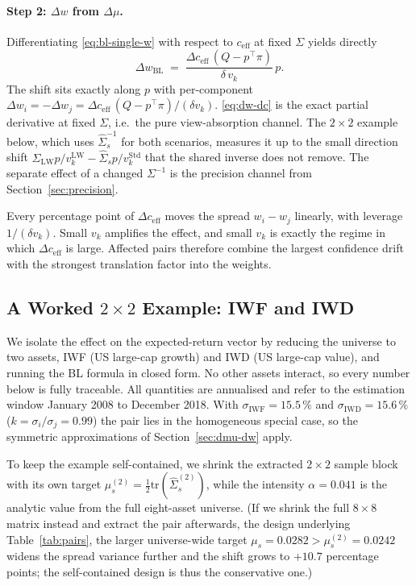 \documentclass[a4paper,11pt]{article}
\theoremstyle{plain}
\theoremstyle{definition}
\newcommand{\Std}{\mathrm{Std}}
\newcommand{\LW}{\mathrm{LW}}
\newcommand{\eff}{\mathrm{eff}}
\begin{document}
\paragraph{Step 2: $\Delta w$ from $\Delta\mu$.}
Differentiating \eqref{eq:bl-single-w} with respect to $c_{\eff}$ at
fixed $\Sigma$ yields directly
\begin{equation}
\label{eq:dw-dc}
  \Delta w_{\mathrm{BL}} \;=\; \frac{\Delta c_{\eff}\,(Q - p^\top\pi)}{\delta\,v_k}\,p.
\end{equation}
The shift sits exactly along $p$ with per-component
$\Delta w_i = -\Delta w_j = \Delta c_{\eff}\,(Q-p^\top\pi)/(\delta v_k)$.
\eqref{eq:dw-dc} is the exact partial derivative at fixed $\Sigma$,
i.e.\ the pure view-absorption channel. The $2\times 2$ example below,
which uses $\hat\Sigma_s^{-1}$ for both scenarios, measures it up to
the small direction shift
$\Sigma_{\LW}p/v_k^{\LW} - \hat\Sigma_s p/v_k^{\Std}$ that the shared
inverse does not remove. The separate effect of a changed $\Sigma^{-1}$
is the precision channel from Section~\ref{sec:precision}.

Every percentage point of $\Delta c_{\eff}$ moves the spread
$w_i - w_j$ linearly, with leverage $1/(\delta v_k)$. Small $v_k$
amplifies the effect, and small $v_k$ is exactly the regime in which
$\Delta c_{\eff}$ is large. Affected pairs therefore combine the largest
confidence drift with the strongest translation factor into the weights.

\subsection{A Worked $2\times 2$ Example: IWF and IWD}
\label{sec:example}

We isolate the effect on the expected-return vector by reducing the
universe to two assets, IWF (US large-cap growth) and IWD (US large-cap
value), and running the BL formula in closed form. No other assets
interact, so every number below is fully traceable. All quantities are
annualised and refer to the estimation window January 2008 to December
2018. With $\sigma_{\mathrm{IWF}} = 15.5\,\%$ and
$\sigma_{\mathrm{IWD}} = 15.6\,\%$ ($k = \sigma_i/\sigma_j = 0.99$) the
pair lies in the homogeneous special case, so the symmetric
approximations of Section~\ref{sec:dmu-dw} apply.

To keep the example self-contained, we shrink the extracted $2\times 2$
sample block with its own target
$\mu_s^{(2)} = \tfrac{1}{2}\mathrm{tr}(\hat\Sigma_s^{(2)})$, while the
intensity $\alpha = 0.041$ is the analytic value from the full
eight-asset universe. (If we shrink the full $8\times 8$ matrix instead
and extract the pair afterwards, the design underlying
Table~\ref{tab:pairs}, the larger universe-wide target
$\mu_s = 0.0282 > \mu_s^{(2)} = 0.0242$ widens the spread variance
further and the shift grows to $+10.7$ percentage points; the
self-contained design is thus the conservative one.)
\end{document}
